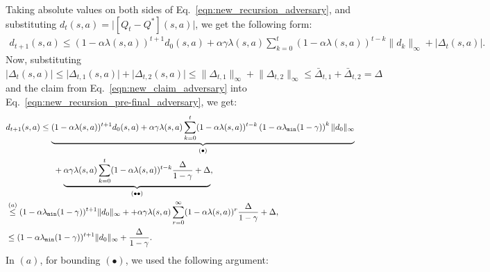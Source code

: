 \documentclass{article}
\begin{document}
Taking absolute values on both sides of  Eq.~\eqref{eqn:new_recursion_adversary}, and substituting $d_{t}(s,a) = \big\lvert [Q_{t} - Q^*](s,a) \big\rvert$, we get the following form:
\begin{equation}\label{eqn:new_recursion_pre-final_adversary}
\begin{aligned}
    d_{t+1}(s,a) \le (1 - \alpha \lambda(s,a))^{t+1}d_0(s,a) + \alpha \gamma \lambda(s,a) \sum_{k=0}^{t} (1 - \alpha \lambda(s,a))^{t-k} \lVert d_k\rVert_{\infty} + \lvert \Delta_t (s,a) \rvert.
\end{aligned}
\end{equation}
Now, substituting \(\lvert \Delta_t(s,a) \rvert \le \lvert \Delta_{t,1}(s,a) \rvert + \lvert \Delta_{t,2}(s,a) \rvert \le \rVert\Delta_{t,1}\lVert_{\infty}+\lVert\Delta_{t,2}\rVert_{\infty} \le \bar{\Delta}_{t,1} + \bar{\Delta}_{t,2} = \Delta \) and the claim from Eq.~\eqref{eqn:new_claim_adversary} into Eq.~\eqref{eqn:new_recursion_pre-final_adversary}, we get:
\begin{equation}
\begin{aligned}\label{eqn:new_applying_induction_adversary}
    & d_{t+1}(s,a) \le \underbrace{(1 - \alpha \lambda(s,a))^{t+1}d_0(s,a) + \alpha \gamma \lambda(s,a) \sum_{k=0}^{t} (1 - \alpha \lambda(s,a))^{t-k} \left(1-\alpha\lambda_{\texttt{min}}(1-\gamma)\right)^{k}\lVert d_0\rVert_{\infty}}_{(\bullet)}  \\
    & \hspace{20 mm} +\underbrace{\alpha\gamma\lambda(s,a)\sum_{k=0}^{t} (1 - \alpha \lambda(s,a))^{t-k} \frac{\Delta}{1-\gamma}+ \Delta}_{(\bullet \bullet)}, \\
    & \overset{(a)}{\le} (1-\alpha \lambda_{\texttt{min}} (1-\gamma))^{t+1} \lVert d_0 \rVert_{\infty} + +\alpha\gamma\lambda(s,a)\sum_{r=0}^{\infty} (1 - \alpha \lambda(s,a))^{r} \frac{\Delta}{1-\gamma}+ \Delta,\\
    & \overset{}{\le} (1-\alpha \lambda_{\texttt{min}} (1-\gamma))^{t+1} \lVert d_0 \rVert_{\infty} + \frac{\Delta}{1-\gamma}.
\end{aligned}
\end{equation}
In $(a)$, for bounding \((\bullet)\), we used the following argument:
\end{document}
